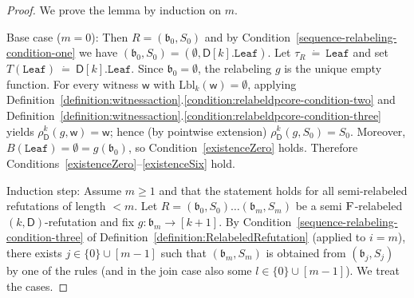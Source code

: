 \documentclass[11pt,a4paper]{article}
\newcommand{\treewidthvalue}{k}
\newcommand{\abag}{\mathfrak{b}}
\newcommand{\leaftype}{\mathtt{Leaf}}
\newcommand{\initialsetgeneric}{\mathtt{Leaf}}
\newcommand{\topbagname}{B}
\newcommand{\topbag}[1]{\topbagname(#1)}
\newcommand{\abstractdecomposition}{\tau}
\newcommand{\defeq}{~\dot{=}~}
\newcommand{\awitness}{\mathsf{w}}
\newcommand{\dpcore}{\mathsf{D}}
\newcommand{\witnessset}{S}
\newcommand{\dprefutation}{R}
\newcommand{\subtermToBag}{T}
\newcommand{\action}{\rho}
\newcommand{\relabelsequence}{\textsc{F}}
\begin{document}
	\begin{proof}
	We prove the lemma by induction on $m$.

Base case ($m=0$): Then $\dprefutation=(\abag_0,\witnessset_0)$ and by Condition~\ref{sequence-relabeling-condition-one} we have $(\abag_0,\witnessset_0)=(\emptyset,\dpcore[\treewidthvalue].\initialsetgeneric)$.
Let $\abstractdecomposition_{\dprefutation}\defeq \leaftype$ and set $\subtermToBag(\leaftype)\defeq \dpcore[\treewidthvalue].\initialsetgeneric$.
Since $\abag_0=\emptyset$, the relabeling $g$ is the unique empty function. For every witness $\awitness$ with $\mathrm{Lbl}_{\treewidthvalue}(\awitness)=\emptyset$, applying Definition~\ref{definition:witnessaction}.\ref{condition:relabeldpcore-condition-two} and Definition~\ref{definition:witnessaction}.\ref{condition:relabeldpcore-condition-three} yields $\action_{\dpcore}^{\treewidthvalue}(g,\awitness)=\awitness$; hence (by pointwise extension) $\action_{\dpcore}^{\treewidthvalue}(g,\witnessset_0)=\witnessset_0$.
Moreover, $\topbag{\leaftype}=\emptyset=g(\abag_0)$, so Condition~\ref{existenceZero} holds. Therefore Conditions~\ref{existenceZero}--\ref{existenceSix} hold.

Induction step: Assume $m\ge 1$ and that the statement holds for all semi-relabeled refutations of length $<m$.
Let $\dprefutation=(\abag_0,\witnessset_0)\dots(\abag_m,\witnessset_m)$ be a semi $\relabelsequence$-relabeled $(\treewidthvalue,\dpcore)$-refutation and fix $g:\abag_m\to [\treewidthvalue+1]$.
By Condition~\ref{sequence-relabeling-condition-three} of Definition~\ref{definition:RelabeledRefutation} (applied to $i=m$), there exists $j\in \{0\}\cup[m-1]$ such that $(\abag_m,\witnessset_m)$ is obtained from $(\abag_j,\witnessset_j)$ by one of the rules (and in the join case also some $l\in \{0\}\cup[m-1]$). We treat the cases.


\end{proof}
\end{document}
